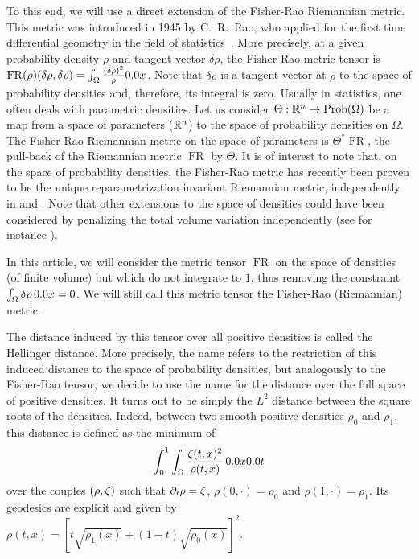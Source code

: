 To this end, we will use a direct extension of the Fisher-Rao Riemannian metric. This metric was introduced in 1945 by C.\ R.\ Rao, who applied for the first time differential geometry in the field of statistics~\cite{radhakrishna1945information}. More precisely, at a given probability density $\rho$ and tangent vector $\delta \rho$, the Fisher-Rao metric tensor is $\operatorname{FR}(\rho)(\delta \rho,\delta \rho) = \int_\Omega \frac{(\delta \rho)^2}{\rho} \d x$. Note that $\delta \rho$ is a tangent vector at $\rho$ to the space of probability densities and, therefore, its integral is zero. Usually in statistics, one often deals with parametric densities. Let us consider $\Theta : \mathbb{R}^n  \to \operatorname{Prob}(\Omega)$ be a map from a space of parameters ($\mathbb{R}^n$) to the space of probability densities on $\Omega$. The Fisher-Rao Riemannian metric on the space of parameters is $\Theta^*\operatorname{FR}$, the pull-back of the Riemannian metric $\operatorname{FR}$ by $\Theta$. 
It is of interest to note that, on the space of probability densities, the Fisher-Rao metric has recently been proven to be the unique reparametrization invariant Riemannian metric, independently in \cite{2012arXiv1207.6736A} and \cite{Bauer:2014aa}.
Note that other extensions to the space of densities could have been considered by penalizing the total volume variation independently (see for instance \cite{Bauer:2014aa}).

In this article, we will consider the metric tensor $\operatorname{FR}$ on the space of densities (of finite volume) but which do not integrate to $1$, thus removing the constraint $\int_\Omega \delta \rho \, \d x = 0$. We will still call this metric tensor the Fisher-Rao (Riemannian) metric.

The distance induced by this tensor over all positive densities is called the Hellinger distance. More precisely, the name refers to the restriction of this induced distance to the space of probability densities, but analogously to the Fisher-Rao tensor, we decide to use the name for the distance over the full space of positive densities.
It turns out to be simply the $L^2$ distance between the square roots of the densities.
Indeed, between two smooth positive densities $\rho_0$ and $\rho_1$, this distance is defined as the minimum of
\[
 \int_0^1 \int_{\Om} \frac{\Z(t,x)^2}{\rho(t,x)}\, \d x \d t 
\]
over the couples $(\rho,\zeta)$ such that $\partial_t \rho = \zeta$, $\rho(0,\cdot)=\rho_0$ and $\rho(1,\cdot)=\rho_1$. Its geodesics are explicit and given by $\rho(t,x) = \left[ t\sqrt{\rho_1(x)}+(1-t)\sqrt{\rho_0(x)}\right]^2$.





